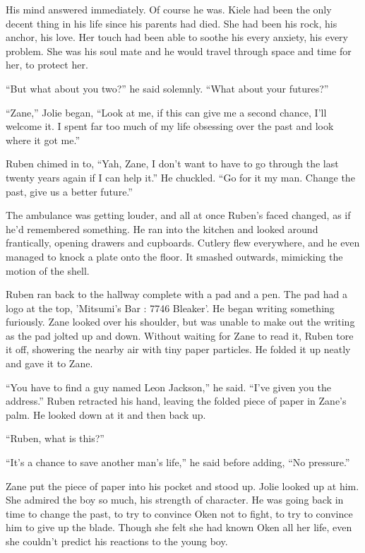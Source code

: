 His mind answered immediately.  Of course he was.  Kiele had been the only decent thing in his life since his parents had died.  She had been his rock, his anchor, his love.  Her touch had been able to soothe his every anxiety, his every problem.  She was his soul mate and he would travel through space and time for her, to protect her.  

``But what about you two?'' he said solemnly.  ``What about your futures?''

``Zane,'' Jolie began, ``Look at me, if this can give me a second chance, I'll welcome it.  I spent far too much of my life obsessing over the past and look where it got me.''

Ruben chimed in to, ``Yah, Zane, I don't want to have to go through the last twenty years again if I can help it.''  He chuckled.  ``Go for it my man.  Change the past, give us a better future.''  

The ambulance was getting louder, and all at once Ruben's faced changed, as if he'd remembered something.  He ran into the kitchen and looked around frantically, opening drawers and cupboards.  Cutlery flew everywhere, and he even managed to knock a plate onto the floor.  It smashed outwards, mimicking the motion of the shell.

Ruben ran back to the hallway complete with a pad and a pen.  The pad had a logo at the top, 'Mitsumi's Bar : 7746 Bleaker'.  He began writing something furiously.  Zane looked over his shoulder, but was unable to make out the writing as the pad jolted up and down.  Without waiting for Zane to read it, Ruben tore it off, showering the nearby air with tiny paper particles.  He folded it up neatly and gave it to Zane.  

``You have to find a guy named Leon Jackson,'' he said.  ``I've given you the address.''  Ruben retracted his hand, leaving the folded piece of paper in Zane's palm.  He looked down at it and then back up.  

``Ruben, what is this?''

``It's a chance to save another man's life,'' he said before adding,  ``No pressure.''

Zane put the piece of paper into his pocket and stood up.  Jolie looked up at him.  She admired the boy so much, his strength of character.  He was going back in time to change the past, to try to convince Oken not to fight, to try to convince him to give up the blade.  Though she felt she had known Oken all her life, even she couldn't predict his reactions to the young boy.  

